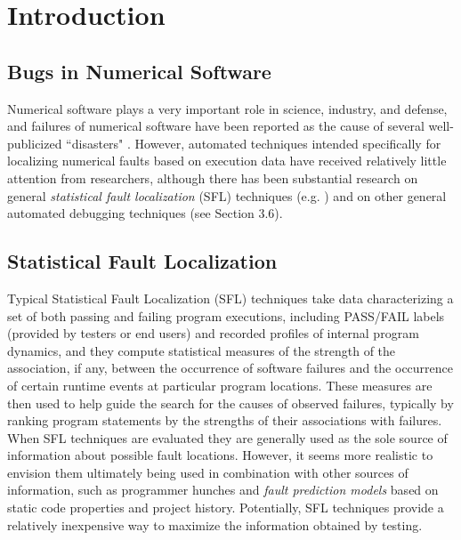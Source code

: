 \chapter{Introduction}\label{chap:introduction}

\section{Bugs in Numerical Software}
Numerical software plays a very important role in science, industry, and defense, and failures of numerical software have been reported as the cause of several well-publicized ``disasters" \cite{VuikWeb,Kanewala2014}.  However, automated techniques intended specifically for localizing numerical faults based on execution data have received relatively little attention from researchers, although there has been substantial research on general {\it statistical fault localization} (SFL) techniques (e.g. \cite{Jones2002,Liblit2004,Liu2005}) and on other general automated debugging techniques (see Section 3.6).


\section{Statistical Fault Localization}
Typical Statistical Fault Localization (SFL) techniques take data characterizing a set of both passing and failing program executions, including PASS/FAIL labels (provided by testers or end users) and recorded profiles of internal program dynamics, and they compute statistical measures of the strength of the association, if any, between the occurrence of software failures and the occurrence of certain runtime events at particular program locations.  These measures are then used to help guide the search for the causes of observed failures, typically by ranking program statements by the strengths of their associations with failures.  When SFL techniques are evaluated they are generally used as the sole source of information about possible fault locations.  However, it seems more realistic to envision them ultimately being used in combination with other sources of information, such as programmer hunches and {\it fault prediction models} \cite{Fenton1999} based on static code properties and project history.  Potentially, SFL techniques provide a relatively inexpensive way to maximize the information obtained by testing.

